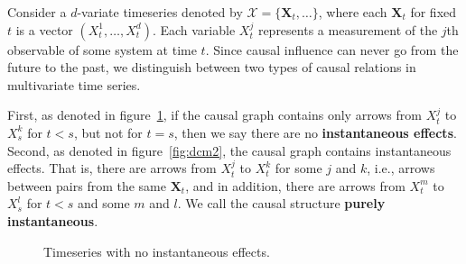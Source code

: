 \documentclass{article}
\begin{document}
Consider a $d$-variate timeseries denoted by $\mathcal{X} = \{\mathbf{X}_t, \dots\}$, where each $\mathbf{X}_t$ for fixed $t$ is a vector $(X_t^1, \dots, X_t^d)$. Each variable $X_t^j$ represents a measurement of the $j$th observable of some system at time $t$. Since causal influence can never go from the future to the past, we distinguish between two types of causal relations in multivariate time series. 

First, as denoted in figure~\ref{fig:dcm1}, if the causal graph contains only arrows from $X_t^j$ to $X_s^k$ for $t < s$, but not for $t = s$, then we say there are no \textbf{instantaneous effects}. Second, as denoted in figure~\ref{fig:dcm2}, the causal graph contains instantaneous effects. That is, there are arrows from $X_t^j$ to $X_t^k$ for some $j$ and $k$, i.e., arrows between pairs from the same $\mathbf{X}_t$, and in addition, there are arrows from $X_t^m$ to $X_s^l$ for $t < s$ and some $m$ and $l$. We call the causal structure \textbf{purely instantaneous}. 

\begin{figure}[H]
    \centering
    \caption{Timeseries with no instantaneous effects.}
    \label{fig:dcm1}
\end{figure}
\end{document}
